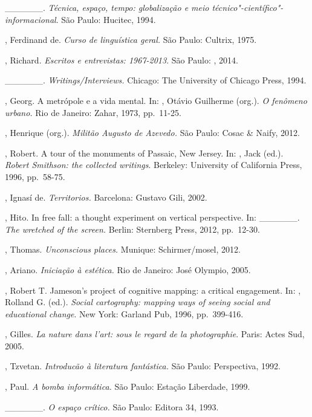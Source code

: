 \begin{Parskip}
\_\_\_\_\_\_. \emph{Técnica, espaço, tempo: globalização e meio
técnico"-científico"-informacional}. São Paulo: Hucitec, 1994.

, Ferdinand de. \emph{Curso de linguística geral.} São Paulo:
Cultrix, 1975.

, Richard. \emph{Escritos e entrevistas: 1967-2013}. São Paulo:
, 2014.

\_\_\_\_\_\_. \emph{Writings/Interviews.} Chicago: The University
of Chicago Press, 1994.

, Georg. A metrópole e a vida mental. In: , Otávio Guilherme
(org.). \emph{O fenômeno urbano.} Rio de Janeiro: Zahar, 1973, pp.~11-25.

, Henrique (org.). \emph{Militão Augusto de Azevedo.} São
Paulo: Cosac \& Naify, 2012.

, Robert. A tour of the monuments of Passaic, New Jersey. In:
, Jack (ed.). \emph{Robert Smithson: the collected writings}.
Berkeley: University of California Press, 1996, pp.~58-75.

, Ignasí de. \emph{Territorios.} Barcelona: Gustavo Gili,
2002.

, Hito. In free fall: a thought experiment on vertical
perspective. In: \_\_\_\_\_\_. \emph{The wretched of the screen.}
Berlin: Sternberg Press, 2012, pp.~12-30.

, Thomas. \emph{Unconscious places.} Munique: Schirmer/mosel, 2012.

, Ariano. \emph{Iniciação à estética.} Rio de Janeiro: José
Olympio, 2005.

, Robert T. Jameson's project of cognitive mapping: a critical
engagement. In: , Rolland G. (ed.). \emph{Social cartography:
mapping ways of seeing social and educational change}. New York: Garland
Pub, 1996, pp.~399-416.

, Gilles. \emph{La nature dans l'art: sous le regard de la
photographie}. Paris: Actes Sud, 2005.

, Tzvetan. \emph{Introducão à literatura fantástica.} São
Paulo: Perspectiva, 1992.

, Paul. \emph{A bomba informática.} São Paulo: Estação
Liberdade, 1999.

\_\_\_\_\_\_. \emph{O espaço crítico.} São Paulo: Editora 34, 1993.


\end{Parskip}
